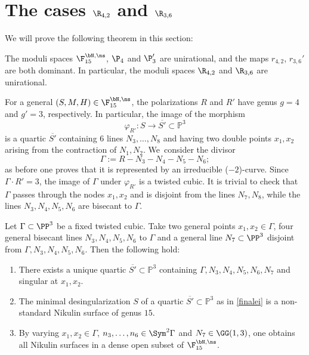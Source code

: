 \section{The cases \texorpdfstring{$\R_{4,2}$ and $\R_{3,6}$}{R}}

We will prove the following theorem in this section:

\begin{thm}\label{brevetto}
The moduli spaces $\F_{15}^{\bN,\ns}$, $\P_4$ and $\P'_{3}$ are unirational, and the maps $r_{4,2}$, $r_{3,6}'$ are both dominant. In particular, the moduli spaces $\R_{4,2}$ and $\R_{3,6}$ are unirational.
\end{thm}
For a general $(S,M,H)\in \F_{15}^{\bN,\ns}$, the polarizations $R$ and $R'$ have genus $g=4$ and $g'=3$, respectively. In particular, the image of the morphism
\[
\varphi_{R'}:S\to \overline{S'}\subset \mathbb P^3
\]
is a quartic $\overline{S'}$ containing $6$ lines $N_3,\ldots,N_8$ and having two double points $x_1,x_2$ arising from the contraction of $N_1,N_2$. We~consider the divisor
\[
\Gamma:=R-N_3-N_4-N_5-N_6;
\]
as before one proves that it is represented by an irreducible ($-2$)-curve. Since $\Gamma\cdot R'=3$, the image of $\Gamma$ under $\varphi_{R'}$ is a twisted cubic. It is trivial to check that $\Gamma$ passes through the nodes $x_1,x_2$ and is disjoint from the lines $N_7,N_8$, while the lines $N_3,N_4,N_5,N_6$ are bisecant to $\Gamma$.

\begin{prop}\label{finale}
Let $\Gamma\subset \PP^3$ be a fixed twisted cubic. Take two general points $x_1,x_2\in \Gamma$, four general bisecant lines $N_3,N_4,N_5,N_6$ to $\Gamma$ and a general line $N_7\subset\PP^3$ disjoint from $\Gamma,N_3,N_4,N_5,N_6$. Then the following hold:
\begin{enumerate}
\item\label{finalei}
There exists a unique quartic $\overline{S'}\subset\mathbb P^3$ containing $\Gamma,N_3,N_4,N_5,N_6,N_7$ and singular at $x_1,x_2$.
\item\label{finaleii}
The minimal desingularization $S$ of a quartic $\overline{S'}\subset\mathbb P^3$ as in \eqref{finalei} is a non-standard Nikulin surface of genus $15$.
\item\label{finaleiii}
By varying $x_1,x_2\in \Gamma$, $n_3,\ldots, n_6\in \Sym^2\Gamma$ and $N_7\in \GG(1,3)$, one obtains all Nikulin surfaces in a dense open subset of $\F_{15}^{\bN,\ns}$.
\end{enumerate}
\end{prop}

